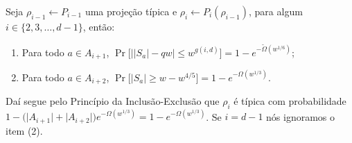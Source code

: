 \begin{prop} \label{typical_whp_Pi}

Seja $\rho_{i - 1} \leftarrow P_{i - 1}$ uma projeção típica e $\rho_{i} \leftarrow P_{i}(\rho_{i - 1})$, para algum $i \in \{2, 3, \dots, d- 1\}$, então:

\begin{enumerate}

	\item Para todo $a \in A_{i + 1}$, $\Pr \Big[\big\lvert \lvert S_{a} \rvert - qw \big\rvert \leq w^{g(i, d)} \Big] = 1 - e^{-\widetilde{\Omega}(w^{1/6})}$;
	
	\item Para todo $a \in A_{i + 2}$, $\Pr \big[ \lvert S_{a} \rvert \geq w - w^{4/5} \big] = 1 - e^{-\Omega(w^{1/3})}$.

\end{enumerate}

Daí segue pelo Princípio da Inclusão-Exclusão que $\rho_{i}$ é típica com probabilidade $1 - \big( \lvert A_{i + 1} \rvert + \lvert A_{i + 2} \rvert \big)e^{-\Omega(w^{1/3})} = 1 - e^{-\Omega(w^{1/3})}$. Se $i = d - 1$ nós ignoramos o item (2).

\end{prop}

